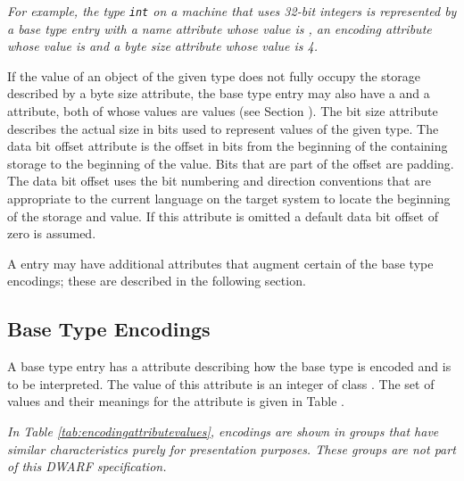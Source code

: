 \textit{For example, the 
 type \texttt{int} on a machine that uses 32-bit
integers is represented by a base type entry with a name
attribute whose value is , an encoding attribute
whose value is \DWATEsigned{}
and a byte size attribute whose value is 4.}

If the value of an object of the given type does not fully
occupy the storage described by a byte size attribute,
\hypertarget{chap:DWATdatabitoffsetbasetypebitlocation}{}
the base type entry may also have a 
\DWATbitsizeDEFN{} and a \DWATdatabitoffsetDEFN{} attribute,
both of whose values are
 values
(see Section ). 
The bit size
attribute describes the actual size in bits used to represent
values of the given type. The data bit offset attribute is the
offset in bits from the beginning of the containing storage to
the beginning of the value. Bits that are part of the offset
are padding. The data bit offset uses the bit numbering and
direction conventions that are appropriate to the current
language on the
target system to locate the beginning of the storage and
value. If this attribute is omitted a default data bit offset
of zero is assumed.

A \DWTAGbasetype{} entry may have additional attributes that
augment certain of the base type encodings; these are described
in the following section.

\subsection{Base Type Encodings}
\label{chap:basetypeencodings}
A base type entry has 
a \DWATencoding{} attribute describing
how the base type is encoded and is to be interpreted. The 
value of this attribute is an integer of class \CLASSconstant.
The set of values and their meanings for the
\DWATencoding{} attribute is given in 
Table .

\textit{In Table \ref{tab:encodingattributevalues}, encodings
are shown in groups that have similar characteristics purely
for presentation purposes. These groups are not part of this
DWARF specification.}


